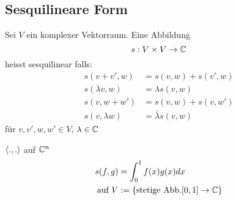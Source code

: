 \subsection{Sesquilineare Form}
\begin{Def}
  Sei $V$ ein komplexer Vektorraum. Eine Abbildung
  \[s:V\times V\to \mathbb{C}\]
  heisst sesquilinear falls:
  \begin{align*}
    s(v+v',w)&= s(v,w)+s(v',w)\\
    s(\lambda v,w)&= \lambda s(v,w)\\
    s(v,w+w')&= s(v,w)+s(v,w')\\
    s(v,\lambda w)&= \bar{\lambda} s(v,w)
  \end{align*}
  für $v,v',w,w'\in V$, $\lambda\in\mathbb{C}$
\end{Def}
\begin{Bsp}
  $\left\langle .,. \right\rangle$ auf $\mathbb{C}^n$
  \begin{align*}
    s(f,g)&= \int^1_0f(x)g(x)dx\\
    \text{auf}\ V&:= \{\text{stetige Abb.}[0,1]\to\mathbb{C}\}
  \end{align*}
\end{Bsp}
